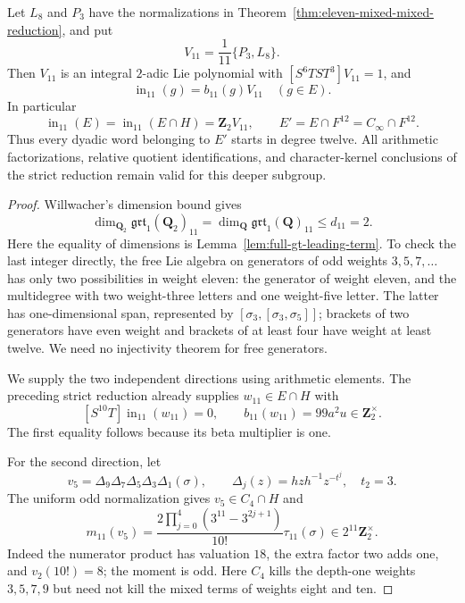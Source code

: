 \begin{proposition}\label{prop:eleven-complete-leading-line}
Let $L_8$ and $P_3$ have the normalizations in
Theorem~\ref{thm:eleven-mixed-mixed-reduction}, and put
\[
 V_{11}=\frac1{11}\{P_3,L_8\}.
\]
Then $V_{11}$ is an integral $2$-adic Lie polynomial with
$[S^6TST^3]V_{11}=1$, and
\[
 \operatorname{in}_{11}(g)=b_{11}(g)V_{11}\quad(g\in E).
\]
In particular
\[
 \operatorname{in}_{11}(E)
 =\operatorname{in}_{11}(E\cap H)=\mathbf Z_2V_{11},
 \qquad E'=E\cap F^{12}=C_\infty\cap F^{12}.
\]
Thus every dyadic word belonging to $E'$ starts in degree twelve.
All arithmetic factorizations, relative quotient identifications,
and character-kernel conclusions of the strict reduction remain
valid for this deeper subgroup.
\end{proposition}

\begin{proof}
Willwacher's dimension bound
\cite[Theorem~1.1, p.~2]{Willwacher} gives
\[
 \dim_{\mathbf Q_2}\mathfrak{grt}_1(\mathbf Q_2)_{11}
 =\dim_{\mathbf Q}\mathfrak{grt}_1(\mathbf Q)_{11}\le d_{11}=2.
\]
Here the equality of dimensions is
Lemma~\ref{lem:full-gt-leading-term}. To check the last integer
directly, the free Lie algebra on generators of odd weights
$3,5,7,\ldots$ has only two possibilities in weight eleven:
the generator of weight eleven, and the multidegree with two
weight-three letters and one weight-five letter. The latter
has one-dimensional span, represented by
$[\sigma_3,[\sigma_3,\sigma_5]]$; brackets of two generators
have even weight and brackets of at least four have weight at
least twelve. We need no injectivity theorem for free generators.

We supply the two independent directions using arithmetic
elements. The preceding strict reduction already supplies
$w_{11}\in E\cap H$ with
\[
 [S^{10}T]\operatorname{in}_{11}(w_{11})=0,\qquad
 b_{11}(w_{11})=99a^2u\in\mathbf Z_2^\times.
\]
The first equality follows because its beta multiplier is one.

For the second direction, let
\[
 v_5=\Delta_9\Delta_7\Delta_5\Delta_3\Delta_1(\sigma),
 \qquad \Delta_j(z)=hzh^{-1}z^{-t^j},\quad t_2=3.
\]
The uniform odd normalization gives $v_5\in C_4\cap H$ and
\[
 m_{11}(v_5)=
 \frac{2\prod_{j=0}^{4}(3^{11}-3^{2j+1})}{10!}
                     \tau_{11}(\sigma)
       \in2^{11}\mathbf Z_2^\times.
\]
Indeed the numerator product has valuation $18$, the extra
factor two adds one, and $v_2(10!)=8$; the moment is odd.
Here $C_4$ kills the depth-one weights $3,5,7,9$ but need not
kill the mixed terms of weights eight and ten.


\end{proof}
